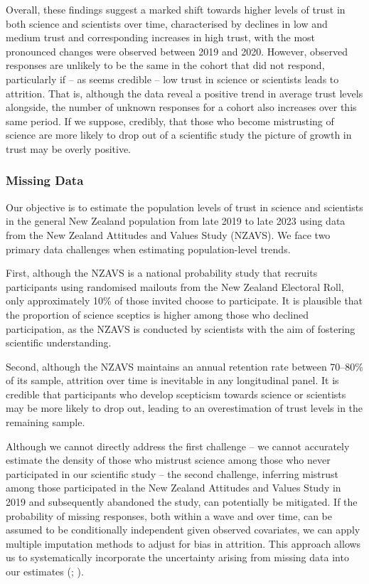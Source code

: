 \documentclass[
  single column]{article}
\begin{document}
Overall, these findings suggest a marked shift towards higher levels of
trust in both science and scientists over time, characterised by
declines in low and medium trust and corresponding increases in high
trust, with the most pronounced changes were observed between 2019 and
2020. However, observed responses are unlikely to be the same in the
cohort that did not respond, particularly if -- as seems credible -- low
trust in science or scientists leads to attrition. That is, although the
data reveal a positive trend in average trust levels alongside, the
number of unknown responses for a cohort also increases over this same
period. If we suppose, credibly, that those who become mistrusting of
science are more likely to drop out of a scientific study the picture of
growth in trust may be overly positive.

\subsubsection{Missing Data}\label{missing-data}

Our objective is to estimate the population levels of trust in science
and scientists in the general New Zealand population from late 2019 to
late 2023 using data from the New Zealand Attitudes and Values Study
(NZAVS). We face two primary data challenges when estimating
population-level trends.

First, although the NZAVS is a national probability study that recruits
participants using randomised mailouts from the New Zealand Electoral
Roll, only approximately 10\% of those invited choose to participate. It
is plausible that the proportion of science sceptics is higher among
those who declined participation, as the NZAVS is conducted by
scientists with the aim of fostering scientific understanding.

Second, although the NZAVS maintains an annual retention rate between
70--80\% of its sample, attrition over time is inevitable in any
longitudinal panel. It is credible that participants who develop
scepticism towards science or scientists may be more likely to drop out,
leading to an overestimation of trust levels in the remaining sample.

Although we cannot directly address the first challenge -- we cannot
accurately estimate the density of those who mistrust science among
those who never participated in our scientific study -- the second
challenge, inferring mistrust among those participated in the New
Zealand Attitudes and Values Study in 2019 and subsequently abandoned
the study, can potentially be mitigated. If the probability of missing
responses, both within a wave and over time, can be assumed to be
conditionally independent given observed covariates, we can apply
multiple imputation methods to adjust for bias in attrition. This
approach allows us to systematically incorporate the uncertainty arising
from missing data into our estimates
(;
).
\end{document}
